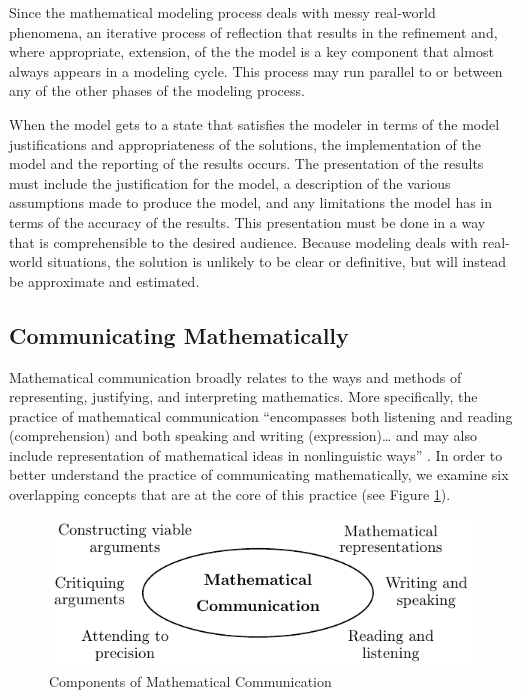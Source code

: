 \documentclass[
]{book}
\theoremstyle{definition}
\theoremstyle{definition}
\theoremstyle{definition}
\theoremstyle{remark}
\begin{document}
Since the mathematical modeling process deals with messy real-world phenomena, an iterative process of reflection that results in the refinement and, where appropriate, extension, of the the model is a key component that almost always appears in a modeling cycle. This process may run parallel to or between any of the other phases of the modeling process.

When the model gets to a state that satisfies the modeler in terms of the model justifications and appropriateness of the solutions, the implementation of the model and the reporting of the results occurs. The presentation of the results must include the justification for the model, a description of the various assumptions made to produce the model, and any limitations the model has in terms of the accuracy of the results. This presentation must be done in a way that is comprehensible to the desired audience. Because modeling deals with real-world situations, the solution is unlikely to be clear or definitive, but will instead be approximate and estimated.

\hypertarget{communicating-mathematically}{%
\subsection{Communicating Mathematically}\label{communicating-mathematically}}

Mathematical communication broadly relates to the ways and methods of representing, justifying, and interpreting mathematics. More specifically, the practice of mathematical communication ``encompasses both listening and reading (comprehension) and both speaking and writing (expression)\ldots{} and may also include representation of mathematical ideas in nonlinguistic ways'' \citep[p.~7]{Communication}. In order to better understand the practice of communicating mathematically, we examine six overlapping concepts that are at the core of this practice (see Figure \ref{fig:communication}).

\begin{figure}

{\centering \includegraphics[width=0.6\linewidth]{tikz/communication} 

}

\caption{Components of Mathematical Communication}\label{fig:communication}
\end{figure}
\end{document}
